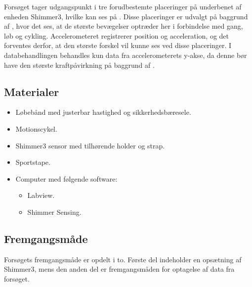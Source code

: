 Forsøget tager udgangspunkt i tre forudbestemte placeringer på underbenet af enheden Shimmer3, hvilke kan ses på . Disse placeringer er udvalgt på baggrund af , hvor det ses, at de største bevægelser optræder her i forbindelse med gang, løb og cykling. Accelerometeret registrerer position og acceleration, og det forventes derfor, at den største forskel vil kunne ses ved disse placeringer. I databehandlingen behandles kun data fra accelerometerets y-akse, da denne bør have den største kraftpåvirkning på baggrund af .

\subsection{Materialer}
\begin{itemize}
	\item Løbebånd med justerbar hastighed og sikkerhedsbæresele.
	\item Motionscykel.
	\item Shimmer3 sensor med tilhørende holder og strap.
	\item Sportstape.
	\item Computer med følgende software:
	\begin{itemize}\vspace{-.15cm}
		\item Labview.
		\item Shimmer Sensing.
	\end{itemize}
\end{itemize}

\subsection{Fremgangsmåde}
Forsøgets fremgangsmåde er opdelt i to. Første del indeholder en opsætning af Shimmer3, mens den anden del er fremgangsmåden for optagelse af data fra forsøget.

